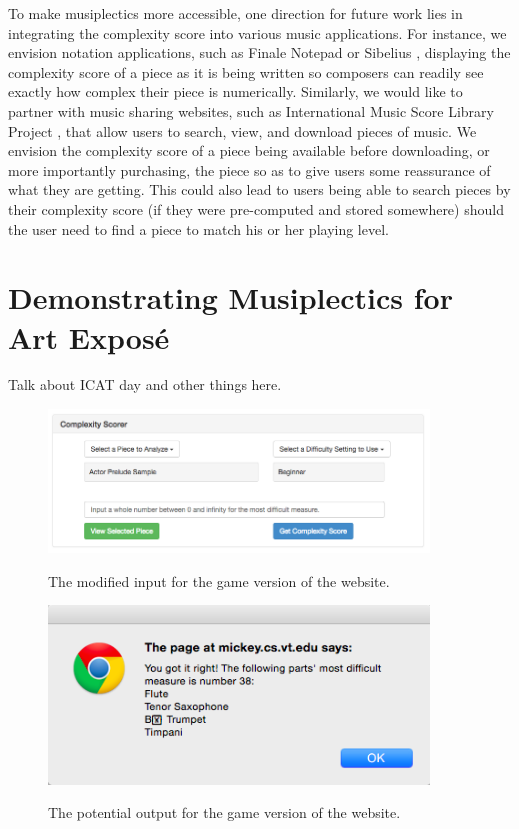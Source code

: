 \documentclass[12pt]{report}
\begin{document}
To make musiplectics more accessible, one direction for future work lies in integrating the complexity score into various music applications. For instance, we envision notation applications, such as Finale Notepad \cite{FinaleNotepad} or Sibelius \cite{Sibelius}, displaying the complexity score of a piece as it is being written so composers can readily see exactly how complex their piece is numerically. Similarly, we would like to partner with music sharing websites, such as International Music Score Library Project \cite{IMSLP}, that allow users to search, view, and download pieces of music. We envision the complexity score of a piece being available before downloading, or more importantly purchasing, the piece so as to give users some reassurance of what they are getting. This could also lead to users being able to search pieces by their complexity score (if they were pre-computed and stored somewhere) should the user need to find a piece to match his or her playing level.

\section{Demonstrating Musiplectics for Art Expos\'e}
\label{sec:icat}

Talk about ICAT day and other things here.


\begin{figure}[ht!]
	\centering
		\caption{The modified input for the game version of the website.}
		\includegraphics[width=0.9\textwidth]{WebsiteGameInput.png}
		\label{image:websitegameinput}
\end{figure}

\begin{figure}[ht!]
	\centering
		\caption{The potential output for the game version of the website.}
		\includegraphics[width=0.9\textwidth]{WebsiteGameOutput.png}
		\label{image:websitegameoutput}
\end{figure}
\end{document}
